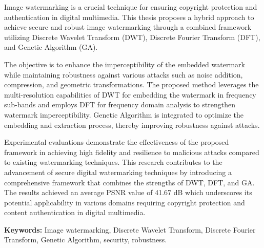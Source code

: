 Image watermarking is a crucial technique for ensuring copyright protection and authentication in digital multimedia. This thesis proposes a hybrid approach to achieve secure and robust image watermarking through a combined framework utilizing Discrete Wavelet Transform (DWT), Discrete Fourier Transform (DFT), and Genetic Algorithm (GA). 

The objective is to enhance the imperceptibility of the embedded watermark while maintaining robustness against various attacks such as noise addition, compression, and geometric transformations. The proposed method leverages the multi-resolution capabilities of DWT for embedding the watermark in frequency sub-bands and employs DFT for frequency domain analysis to strengthen watermark imperceptibility. Genetic Algorithm is integrated to optimize the embedding and extraction process, thereby improving robustness against attacks.

Experimental evaluations demonstrate the effectiveness of the proposed framework in achieving high fidelity and resilience to malicious attacks compared to existing watermarking techniques. This research contributes to the advancement of secure digital watermarking techniques by introducing a comprehensive framework that combines the strengths of DWT, DFT, and GA. The results achieved an average PSNR value of 41.67 dB which underscores its potential applicability in various domains requiring copyright protection and content authentication in digital multimedia.

\textbf{Keywords:} Image watermarking, Discrete Wavelet Transform, Discrete Fourier Transform, Genetic Algorithm, security, robustness.
